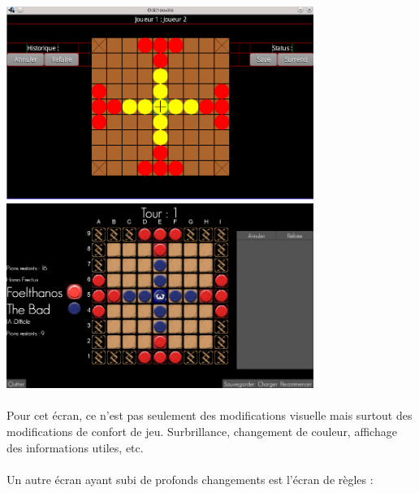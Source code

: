 \documentclass[11pt]{article} %
\begin{document}
\begin{sffamily}
\begin{center}
\includegraphics[width=10cm]{snapshot5.png}
\includegraphics[width=10cm]{validDoc3.jpg}
\end{center}

\paragraph{}
Pour cet écran, ce n'est pas seulement des modifications visuelle mais surtout des modifications de confort de jeu. Surbrillance, changement de couleur, affichage des informations utiles, etc.
\paragraph{}
Un autre écran ayant subi de profonds changements est l'écran de règles :


\end{sffamily}
\end{document}
